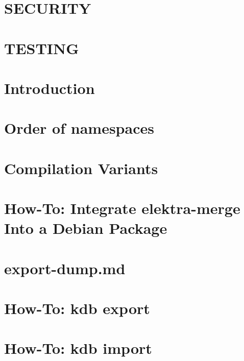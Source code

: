 \documentclass[twoside]{book}
\newcommand{\+}{\discretionary{\mbox{\scriptsize$\hookleftarrow$}}{}{}}
\begin{document}
\chapter{S\+E\+C\+U\+R\+I\+T\+Y}
\label{doc_SECURITY_md}
\hypertarget{doc_SECURITY_md}{}

\chapter{T\+E\+S\+T\+I\+N\+G}
\label{doc_TESTING_md}
\hypertarget{doc_TESTING_md}{}

\chapter{Introduction}
\label{doc_tutorials_application-integration_md}
\hypertarget{doc_tutorials_application-integration_md}{}

\chapter{Order of namespaces}
\label{doc_tutorials_cascading_md}
\hypertarget{doc_tutorials_cascading_md}{}

\chapter{Compilation Variants}
\label{doc_tutorials_compilation-variants_md}
\hypertarget{doc_tutorials_compilation-variants_md}{}

\chapter{How-\/\+To\+: Integrate elektra-\/merge Into a Debian Package}
\label{doc_tutorials_elektra-merge-integration_md}
\hypertarget{doc_tutorials_elektra-merge-integration_md}{}

\chapter{export-\/dump.md}
\label{doc_tutorials_export-dump_md}
\hypertarget{doc_tutorials_export-dump_md}{}

\chapter{How-\/\+To\+: kdb export}
\label{doc_tutorials_export_md}
\hypertarget{doc_tutorials_export_md}{}

\chapter{How-\/\+To\+: kdb import}
\label{doc_tutorials_import_md}
\hypertarget{doc_tutorials_import_md}{}

\end{document}
